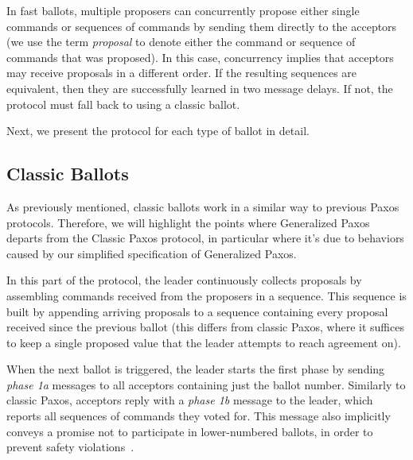 In fast ballots, multiple proposers can concurrently propose either single commands or sequences of commands by sending them directly to the acceptors (we use the term \textit{proposal} to denote either the command or sequence of commands that was proposed).
In this case, concurrency implies that acceptors may receive proposals in a different order. If the resulting sequences are equivalent, then they are successfully learned in two message delays. If not, the protocol must fall back to using a classic ballot.

Next, we present the protocol for each type of ballot in detail.

\subsection{Classic Ballots} 

As previously mentioned, classic ballots work in a similar way to previous Paxos protocols. Therefore, we will highlight the points where Generalized Paxos departs from the Classic Paxos protocol, in particular where it's due to behaviors caused by our simplified specification of Generalized Paxos.\par
In this part of the protocol, the leader continuously collects proposals by assembling commands received from the proposers in a sequence. This sequence is built by appending arriving proposals to a sequence containing every proposal received since the previous ballot (this differs from classic Paxos, where it suffices to keep a single proposed value that the leader attempts to reach agreement on).\par
When the next ballot is triggered, the leader starts the first phase by sending \textit{phase 1a} messages to all acceptors containing just the ballot number. Similarly to classic Paxos, acceptors reply with a \textit{phase 1b} message to the leader, which reports all sequences of commands they voted for. This message also implicitly conveys a promise not to participate in lower-numbered ballots, in order to prevent safety violations~\cite{Lamport:1998}.

